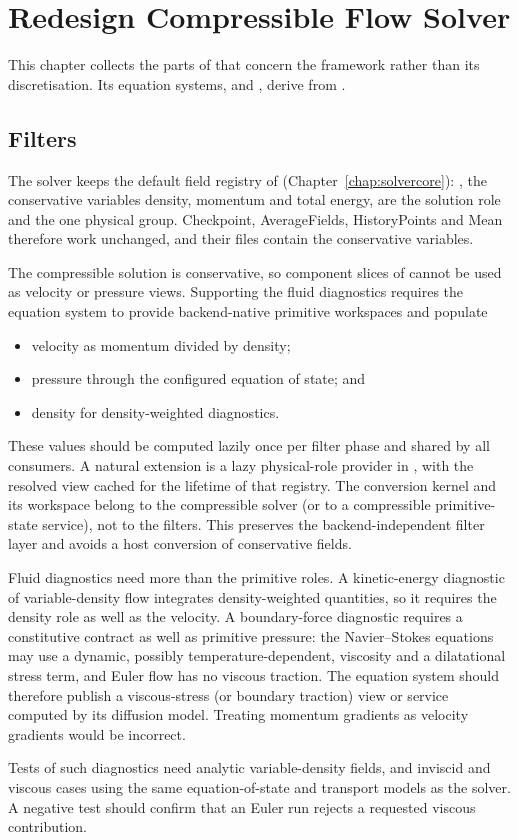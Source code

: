 \chapter{Redesign Compressible Flow Solver}
\label{chap:redesign-cfs}

This chapter collects the parts of  that
concern the  framework rather than its discretisation. Its
equation systems,  and , derive from
.

\section{Filters}
\label{sec:redesign-cfs-filters}

The solver keeps the default field registry of 
(Chapter~\ref{chap:solvercore}): , the conservative variables
density, momentum and total energy, are the solution role and the one
physical group. Checkpoint, AverageFields, HistoryPoints and Mean therefore
work unchanged, and their files contain the conservative variables.

The compressible solution is conservative, so component slices of
 cannot be used as velocity or pressure views. Supporting the
fluid diagnostics requires the equation system to provide backend-native
primitive workspaces and populate

\begin{itemize}
\item velocity as momentum divided by density;
\item pressure through the configured equation of state; and
\item density for density-weighted diagnostics.
\end{itemize}

These values should be computed lazily once per filter phase and shared by all
consumers. A natural extension is a lazy physical-role provider in
, with the resolved view cached for the lifetime of that
registry. The conversion kernel and its workspace belong to the compressible
solver (or to a compressible primitive-state service), not to the filters.
This preserves the backend-independent filter layer and avoids a host
conversion of conservative fields.

Fluid diagnostics need more than the primitive roles. A kinetic-energy
diagnostic of variable-density flow integrates density-weighted quantities,
so it requires the density role as well as the velocity. A boundary-force
diagnostic requires a constitutive contract as well as primitive pressure:
the Navier--Stokes equations may use a dynamic, possibly
temperature-dependent, viscosity and a dilatational stress term, and Euler
flow has no viscous traction. The equation system should therefore publish a
viscous-stress (or boundary traction) view or service computed by its
diffusion model. Treating momentum gradients as velocity gradients would be
incorrect.

Tests of such diagnostics need analytic variable-density fields, and
inviscid and viscous cases using the same equation-of-state and transport
models as the solver. A negative test should confirm that an Euler run
rejects a requested viscous contribution.

